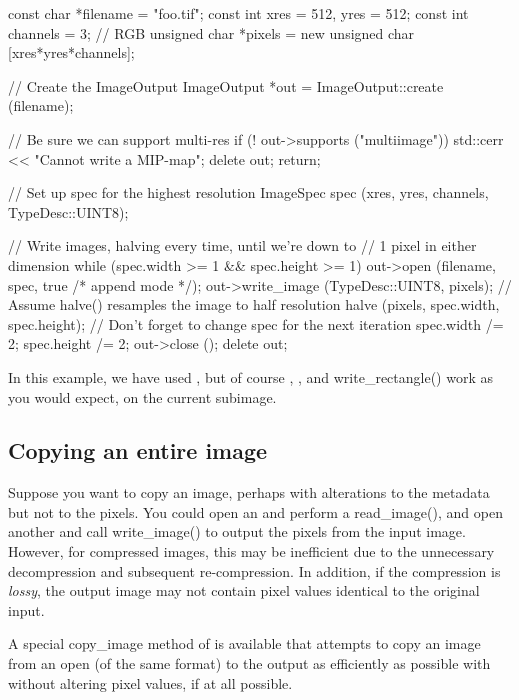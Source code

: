 \begin{code}
        const char *filename = "foo.tif";
        const int xres = 512, yres = 512;
        const int channels = 3;  // RGB
        unsigned char *pixels = new unsigned char [xres*yres*channels];

        // Create the ImageOutput
        ImageOutput *out = ImageOutput::create (filename);

        // Be sure we can support multi-res
        if (! out->supports ("multiimage")) {
            std::cerr << "Cannot write a MIP-map\n";
            delete out;
            return;
        }

        // Set up spec for the highest resolution
        ImageSpec spec (xres, yres, channels, TypeDesc::UINT8);

        // Write images, halving every time, until we're down to
        // 1 pixel in either dimension
        while (spec.width >= 1 && spec.height >= 1) {
            out->open (filename, spec, true /* append mode */);
            out->write_image (TypeDesc::UINT8, pixels);
            // Assume halve() resamples the image to half resolution
            halve (pixels, spec.width, spec.height);
            // Don't forget to change spec for the next iteration
            spec.width /= 2;
            spec.height /= 2;
        }
        out->close ();
        delete out;
\end{code}

In this example, we have used \writeimage, but of course \writescanline,
\writetile, and {\cf write_rectangle()} work as you would expect, on the
current subimage.

\subsection{Copying an entire image}
\label{sec:imageoutput:copyimage}

Suppose you want to copy an image, perhaps with alterations to the 
metadata but not to the pixels.  You could open an \ImageInput and
perform a {\cf read_image()}, and open another \ImageOutput and
call {\cf write_image()} to output the pixels from the input image.
However, for compressed images, this may be inefficient due to the
unnecessary decompression and subsequent re-compression.  In addition,
if the compression is \emph{lossy}, the output image may not contain
pixel values identical to the original input.

A special {\cf copy_image} method of \ImageOutput is available that
attempts to copy an image from an open \ImageInput (of the same
format) to the output as efficiently as possible with without altering
pixel values, if at all possible.

